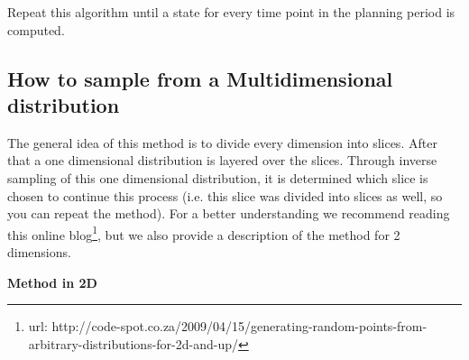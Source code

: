 Repeat this algorithm until a state for every time point in the planning period is computed.


\subsection{How to sample from a Multidimensional distribution}

The general idea of this method is to divide every dimension into slices. After that a one dimensional distribution is layered over the slices. Through inverse sampling of this one dimensional distribution, it is determined which slice is chosen to continue this process (i.e. this slice was divided into slices as well, so you can repeat the method). For a better understanding we recommend reading this online blog\footnote{\label{blog}url: http://code-spot.co.za/2009/04/15/generating-random-points-from-arbitrary-distributions-for-2d-and-up/}, but we also provide a description of the method for 2 dimensions.\\

\clearpage

\textbf{Method in 2D}

